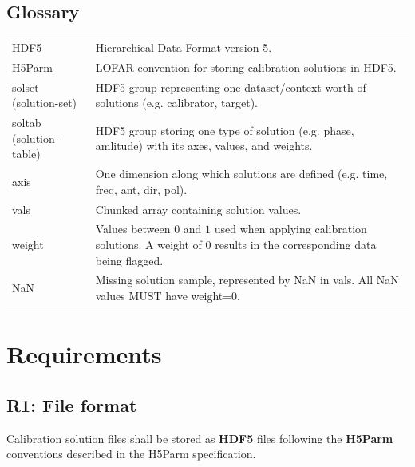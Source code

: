 \documentclass[a4paper,10pt,bibtotoc]{scrartcl}
\begin{document}
\subsection{Glossary}
\begin{center}
  \tablelasttail{\hline}
  \begin{supertabular}{lp{12cm}}
    HDF5 & Hierarchical Data Format version 5. \\
    H5Parm & LOFAR convention for storing calibration solutions in HDF5.  \\
    solset (solution-set) & HDF5 group representing one dataset/context worth of solutions (e.g. calibrator, target).  \\
    soltab (solution-table) & HDF5 group storing one type of solution (e.g. phase, amlitude) with its axes, values, and weights.  \\
    axis & One dimension along which solutions are defined (e.g. time, freq, ant, dir, pol). \\
    vals & Chunked array containing solution values. \\
    weight & Values between $0$ and $1$ used when applying calibration solutions. A weight of $0$ results in the corresponding data being flagged.\\
    NaN & Missing solution sample, represented by NaN in vals. All NaN values MUST have weight=0. \\
  \end{supertabular}
\end{center}


\section{Requirements}
\label{sec:requirements}

\subsection*{R1: File format}
Calibration solution files shall be stored as \textbf{HDF5} files following the
\textbf{H5Parm} conventions described in the H5Parm specification.
\end{document}

